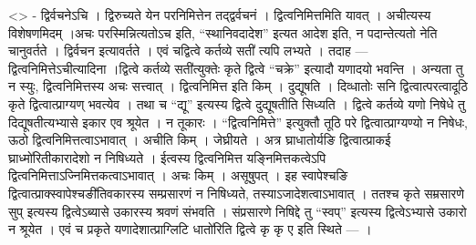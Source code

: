 \textless{}\textgreater{} - द्विर्वचनेऽचि । द्विरुच्यते येन परनिमित्तेन
तद्द्वर्वचनं । द्वित्वनिमित्तमिति यावत् । अचीत्यस्य विशेषणमिदम् ।अचः
परस्मिन्नित्यतोऽच इति, ``स्थानिवदादेश'' इत्यत आदेश इति, न पदान्तेत्यतो
नेति चानुवर्तते । द्विर्वचन इत्यावर्तते । एवं चद्वित्वे कर्तव्ये सती॑
त्यपि लभ्यते । तदाह --- द्वित्वनिमित्तेऽचीत्यादिना ।द्वित्वे कर्तव्ये
सती॑त्युक्तेः कृते द्वित्वे ``चक्रे'' इत्यादौ यणादयो भवन्ति । अन्यता तु
न स्युः, द्वित्वनिमित्तस्य अचः सत्त्वात् । द्वित्वनिमित्त इति किम् ।
दुद्यूषति । दिव्धातोः सनि द्वित्वात्परत्वादूठि कृते द्वित्वात्प्राग्यण्
भवत्येव । तथा च ``द्यू'' इत्यस्य द्वित्वे दुद्यूषतीति सिध्यति । द्वित्वे
कर्तव्ये यणो निषेधे तु दिद्यूषतीत्यभ्यासे इकार एव श्रूयेत । न तूकारः ।
``द्वित्वनिमित्ते'' इत्युक्तौ तूठि परे द्वित्वात्प्राग्यण्यो न निषेधः,
ऊठो द्वित्वनिमित्तत्वाऽभावात् । अचीति किम् । जेघ्रीयते । अत्र
घ्राधातोर्यङि द्वित्वात्प्राकई घ्राध्मो॑रितीकारादेशो न निषिध्यते ।
ईत्वस्य द्वित्वनिमित्त यङ्निमित्तकत्वेऽपि
द्वित्वनिमित्ताऽज्निमित्तकत्वाऽभावात् । अचः किम् । असूषुपत् । इह
स्वापेश्चङि द्वित्वात्प्राक्स्वापेश्चङी॑तिवकारस्य सम्प्रसारणं न
निषिध्यते, तस्याऽजादेशत्वाऽभावात् । ततश्च कृते सम्रसारणे सुप् इत्यस्य
द्वित्वेऽब्यासे उकारस्य श्रवणं संभवति । संप्रसारणे निषिद्दे तु ``स्वप्''
इत्यस्य द्वित्वेऽभ्यासे उकारो न श्रूयेत । एवं च प्रकृते
यणादेशात्प्राग्लिटि धातो॑रिति द्वित्वे कृ कृ ए इति स्थिते --- ।
